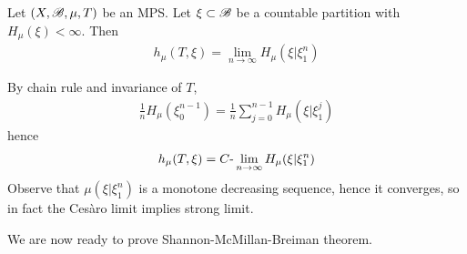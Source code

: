 \documentclass[12pt,a4paper]{report}
\newenvironment{proof}
{\begin{changemargin}{1cm}{0.5cm} 
	}%
	{\end{changemargin}
}
\begin{document}
\lem Let $(X,\mathscr{B}, \mu, T)$ be an MPS. Let $\xi \subset \mathscr{B}$ be a countable partition with $H_{\mu}(\xi)< \infty$. Then
\begin{align*}
h_{\mu}(T,\xi) = \lim_{n\rightarrow \infty} H_{\mu}(\xi | \xi_1^n)
\end{align*}
\begin{proof}
\pf By chain rule and invariance of $T$,
\begin{align*}
\frac{1}{n} H_{\mu}(\xi_0^{n-1}) = \frac{1}{n} \sum_{j=0}^{n-1} H_{\mu}(\xi | \xi_1^j)
\end{align*}
hence
\begin{align*}
h_{\mu}(T,\xi) = C\text{-}\lim_{n\rightarrow \infty} H_{\mu}(\xi | \xi_1^n)
\end{align*}
Observe that $\mu(\xi | \xi_1^n)$ is a monotone decreasing sequence, hence it converges, so in fact the Ces\`{a}ro limit implies strong limit.

\eop
\end{proof}
\s

We are now ready to prove Shannon-McMillan-Breiman theorem.
\s
\end{document}
